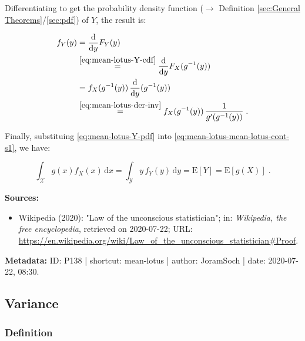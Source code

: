 \documentclass[a4paper,12pt,twoside]{book}
\begin{document}
Differentiating to get the probability density function ($\rightarrow$ Definition \ref{sec:General Theorems}/\ref{sec:pdf}) of $Y$, the result is:

\begin{equation} \label{eq:mean-lotus-Y-pdf}
\begin{split}
f_Y(y) &= \frac{\mathrm{d}}{\mathrm{d}y} F_Y(y) \\
&\overset{\eqref{eq:mean-lotus-Y-cdf}}{=} \frac{\mathrm{d}}{\mathrm{d}y} F_X(g^{-1}(y)) \\
&= f_X(g^{-1}(y)) \, \frac{\mathrm{d}}{\mathrm{d}y} (g^{-1}(y)) \\
&\overset{\eqref{eq:mean-lotus-der-inv}}{=} f_X(g^{-1}(y)) \, \frac{1}{g'(g^{-1}(y))} \; .
\end{split}
\end{equation}

Finally, substituing \eqref{eq:mean-lotus-Y-pdf} into \eqref{eq:mean-lotus-mean-lotus-cont-s1}, we have:

\begin{equation} \label{eq:mean-lotus-mean-lotus-cont-s2}
\int_{\mathcal{X}} g(x) f_X(x) \, \mathrm{d}x = \int_{\mathcal{Y}} y \, f_Y(y) \, \mathrm{d}y = \mathrm{E}[Y] = \mathrm{E}[g(X)] \; .
\end{equation}


\vspace{1em}
\textbf{Sources:}
\begin{itemize}
\item Wikipedia (2020): "Law of the unconscious statistician"; in: \textit{Wikipedia, the free encyclopedia}, retrieved on 2020-07-22; URL: \url{https://en.wikipedia.org/wiki/Law_of_the_unconscious_statistician#Proof}.
\end{itemize}


\vspace{1em}
\textbf{Metadata:} ID: P138 | shortcut: mean-lotus | author: JoramSoch | date: 2020-07-22, 08:30.
\vspace{1em}



\subsection{Variance}

\subsubsection[\textit{Definition}]{Definition} \label{sec:var}
\setcounter{equation}{0}
\end{document}
